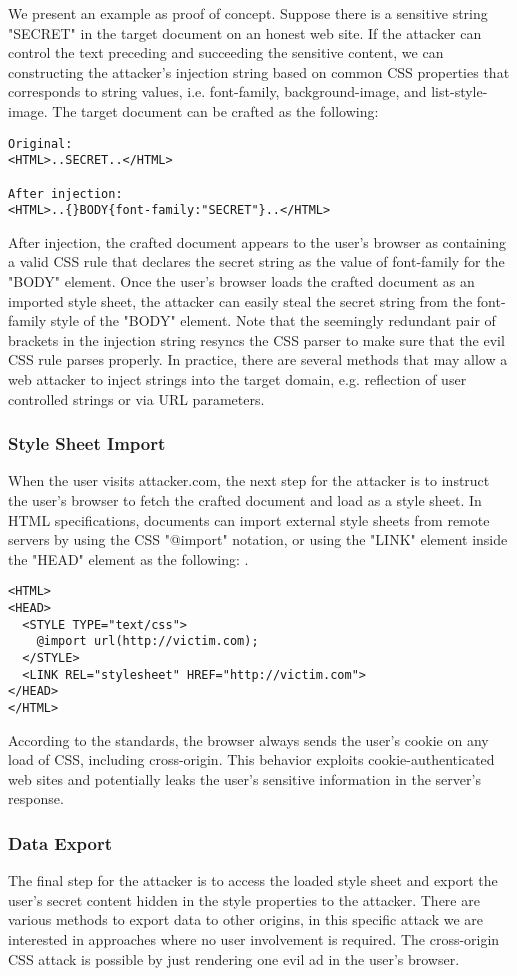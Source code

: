 \documentclass{acm_proc_article-sp}
\begin{document}
We present an example as proof of concept. Suppose there is a sensitive string "SECRET" in the target document on an honest web site. If the attacker can control the text preceding and succeeding the sensitive content, we can constructing the attacker's injection string based on common CSS properties that corresponds to string values, i.e. font-family, background-image, and list-style-image. The target document can be crafted as the following:
\begin{verbatim}
Original:
<HTML>..SECRET..</HTML>

After injection:
<HTML>..{}BODY{font-family:"SECRET"}..</HTML>
\end{verbatim}
After injection, the crafted document appears to the user's browser as containing a valid CSS rule that declares the secret string as the value of font-family for the "BODY" element. Once the user's browser loads the crafted document as an imported style sheet, the attacker can easily steal the secret string from the font-family style of the "BODY" element. Note that the seemingly redundant pair of brackets in the injection string resyncs the CSS parser to make sure that the evil CSS rule parses properly. In practice, there are several methods that may allow a web attacker to inject strings into the target domain, e.g. reflection of user controlled strings or via URL parameters.

\subsubsection{Style Sheet Import}
When the user visits attacker.com, the next step for the attacker is to instruct the user's browser to fetch the crafted document and load as a style sheet. In HTML specifications\cite{html}, documents can import external style sheets from remote servers by using the CSS "@import" notation, or using the "LINK" element inside the "HEAD" element as the following: .
\begin{verbatim}
<HTML>
<HEAD>
  <STYLE TYPE="text/css">
    @import url(http://victim.com);
  </STYLE>
  <LINK REL="stylesheet" HREF="http://victim.com">
</HEAD>
</HTML>
\end{verbatim}
According to the standards, the browser always sends the user's cookie on any load of CSS, including cross-origin. This behavior exploits cookie-authenticated web sites and potentially leaks the user's sensitive information in the server's response.

\subsubsection{Data Export}
The final step for the attacker is to access the loaded style sheet and export the user's secret content hidden in the style properties to the attacker. There are various methods to export data to other origins, in this specific attack we are interested in approaches where no user involvement is required. The cross-origin CSS attack is possible by just rendering one evil ad in the user's browser. 
\end{document}
